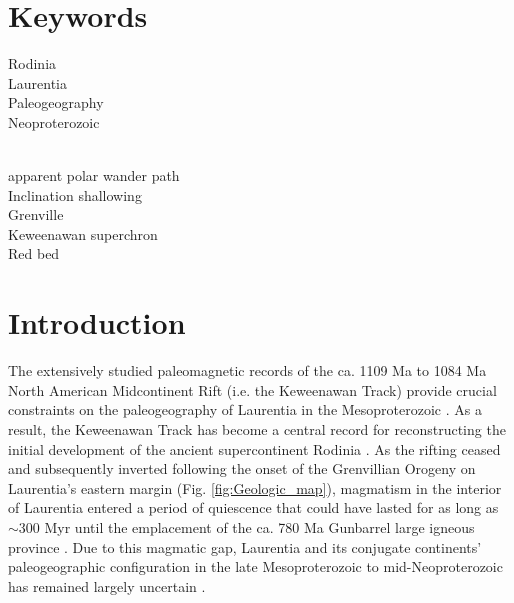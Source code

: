 \documentclass[draft]{agujournal2019}
\begin{document}
\section*{Keywords}
Rodinia\\
Laurentia  \\
Paleogeography\\
Neoproterozoic\\
\

apparent polar wander path\\
Inclination shallowing\\
Grenville\\
Keweenawan superchron\\
Red bed\\

\section*{Introduction}

The extensively studied paleomagnetic records of the ca. 1109 Ma to 1084 Ma North American Midcontinent Rift (i.e. the Keweenawan Track) provide crucial constraints on the paleogeography of Laurentia in the Mesoproterozoic \cite{Swanson-Hysell2019a}. As a result, the Keweenawan Track has become a central record for reconstructing the initial development of the ancient supercontinent Rodinia \cite{2021a}. As the rifting ceased and subsequently inverted following the onset of the Grenvillian Orogeny on Laurentia's eastern margin (Fig. \ref{fig:Geologic_map}), magmatism in the interior of Laurentia entered a period of quiescence that could have lasted for as long as $\sim$300 Myr until the emplacement of the ca. 780 Ma Gunbarrel large igneous province \cite{Harlan2003a, Mackinder2019a}. Due to this magmatic gap, Laurentia and its conjugate continents' paleogeographic configuration in the late Mesoproterozoic to mid-Neoproterozoic has remained largely uncertain \cite{Swanson-Hysell2021c}.
\end{document}

